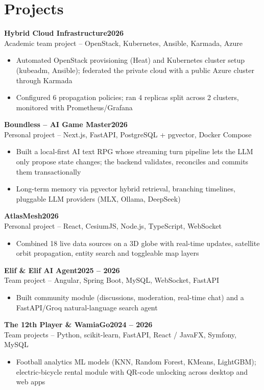 \documentclass[10pt]{article}
\newcommand{\entry}[4]{%
  \textbf{#1}\hfill\textbf{#2}\\
  #3\hfill #4\vspace{-1pt}}
\newcommand{\gap}{\vspace{3pt}}
\begin{document}
\section{Projects}

\entry{Hybrid Cloud Infrastructure}{2026}{Academic team project -- OpenStack, Kubernetes, Ansible, Karmada, Azure}{}
\begin{itemize}
  \item Automated OpenStack provisioning (Heat) and Kubernetes cluster setup (kubeadm, Ansible); federated the private cloud with a public Azure cluster through Karmada
  \item Configured 6 propagation policies; ran 4 replicas split across 2 clusters, monitored with Prometheus/Grafana
\end{itemize}
\gap

\entry{Boundless -- AI Game Master}{2026}{Personal project -- Next.js, FastAPI, PostgreSQL + pgvector, Docker Compose}{}
\begin{itemize}
  \item Built a local-first AI text RPG whose streaming turn pipeline lets the LLM only propose state changes; the backend validates, reconciles and commits them transactionally
  \item Long-term memory via pgvector hybrid retrieval, branching timelines, pluggable LLM providers (MLX, Ollama, DeepSeek)
\end{itemize}
\gap

\entry{AtlasMesh}{2026}{Personal project -- React, CesiumJS, Node.js, TypeScript, WebSocket}{}
\begin{itemize}
  \item Combined 18 live data sources on a 3D globe with real-time updates, satellite orbit propagation, entity search and toggleable map layers
\end{itemize}
\gap

\entry{Elif \& Elif AI Agent}{2025 -- 2026}{Team project -- Angular, Spring Boot, MySQL, WebSocket, FastAPI}{}
\begin{itemize}
  \item Built community module (discussions, moderation, real-time chat) and a FastAPI/Groq natural-language search agent
\end{itemize}
\gap

\entry{The 12th Player \textmd{\& WamiaGo}}{2024 -- 2026}{Team projects -- Python, scikit-learn, FastAPI, React / JavaFX, Symfony, MySQL}{}
\begin{itemize}
  \item Football analytics ML models (KNN, Random Forest, KMeans, LightGBM); electric-bicycle rental module with QR-code unlocking across desktop and web apps
\end{itemize}
\end{document}

